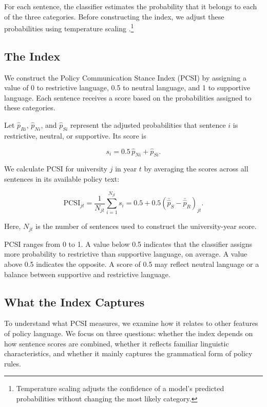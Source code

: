 \documentclass[11pt]{article}
\begin{document}
For each sentence, the classifier estimates the probability that it belongs to each of the three categories. Before constructing the index, we adjust these probabilities using temperature scaling \citep{guo2017calibration}.\footnote{Temperature scaling adjusts the confidence of a model's predicted probabilities without changing the most likely category.}

\subsection{The Index}

We construct the Policy Communication Stance Index (PCSI) by assigning a value of 0 to restrictive language, 0.5 to neutral language, and 1 to supportive language. Each sentence receives a score based on the probabilities assigned to these categories.

Let $\hat p_{Ri}$, $\hat p_{Ni}$, and $\hat p_{Si}$ represent the adjusted probabilities that sentence $i$ is restrictive, neutral, or supportive. Its score is

\begin{equation}
s_i = 0.5\,\hat p_{Ni} + \hat p_{Si}.
\end{equation}

We calculate PCSI for university $j$ in year $t$ by averaging the scores across all sentences in its available policy text:

\begin{equation}
\text{PCSI}_{jt}
= \frac{1}{N_{jt}}\sum_{i=1}^{N_{jt}} s_i
= 0.5 + 0.5\left(\bar{\hat p}_{S} - \bar{\hat p}_{R}\right)_{jt}.
\end{equation}

Here, $N_{jt}$ is the number of sentences used to construct the university-year score.

PCSI ranges from 0 to 1. A value below 0.5 indicates that the classifier assigns more probability to restrictive than supportive language, on average. A value above 0.5 indicates the opposite. A score of 0.5 may reflect neutral language or a balance between supportive and restrictive language.

\subsection{What the Index Captures}\label{sec:assessment-method}

To understand what PCSI measures, we examine how it relates to other features of policy language. We focus on three questions: whether the index depends on how sentence scores are combined, whether it reflects familiar linguistic characteristics, and whether it mainly captures the grammatical form of policy rules.
\end{document}
